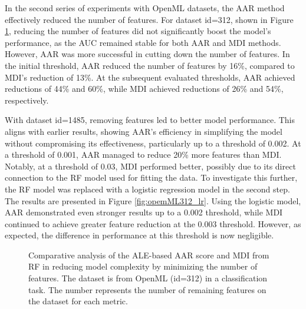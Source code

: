 

In the second series of experiments with OpenML datasets, the \gls{AAR} method effectively reduced the number of features. For dataset id=312, shown in Figure \ref{fig:opemML312}, reducing the number of features did not significantly boost the model's performance, as the \gls{AUC} \cite{Fawcett2006AnAnalysis} remained stable for both \gls{AAR} and \gls{MDI} methods. However, \gls{AAR} was more successful in cutting down the number of features. In the initial threshold, \gls{AAR} reduced the number of features by 16\%, compared to \gls{MDI}'s reduction of 13\%. At the subsequent evaluated thresholds, \gls{AAR} achieved reductions of 44\% and 60\%, while \gls{MDI} achieved reductions of 26\% and 54\%, respectively.

With dataset id=1485, removing features led to better model performance. This aligns with earlier results, showing \gls{AAR}'s efficiency in simplifying the model without compromising its effectiveness, particularly up to a threshold of 0.002. At a threshold of 0.001, \gls{AAR} managed to reduce 20\% more features than \gls{MDI}. Notably, at a threshold of 0.03, \gls{MDI} performed better,  possibly due to its direct connection to the RF model used for fitting the data. To investigate this further, the \gls{RF} model was replaced with a logistic regression model in the second step. The results are presented in Figure \ref{fig:opemML312_lr}. Using the logistic model, \gls{AAR} demonstrated even stronger results up to a 0.002 threshold, while \gls{MDI} continued to achieve greater feature reduction at the 0.003 threshold. However, as expected, the difference in performance at this threshold is now negligible.


\begin{figure}[ht!]
\centering
  \caption{Comparative analysis of the ALE-based AAR score and MDI from RF in reducing model complexity by minimizing the number of features. The dataset is from OpenML (id=312) in a classification task. The number represents the number of remaining features on the dataset for each metric. }
    \label{fig:opemML312}
\end{figure}


